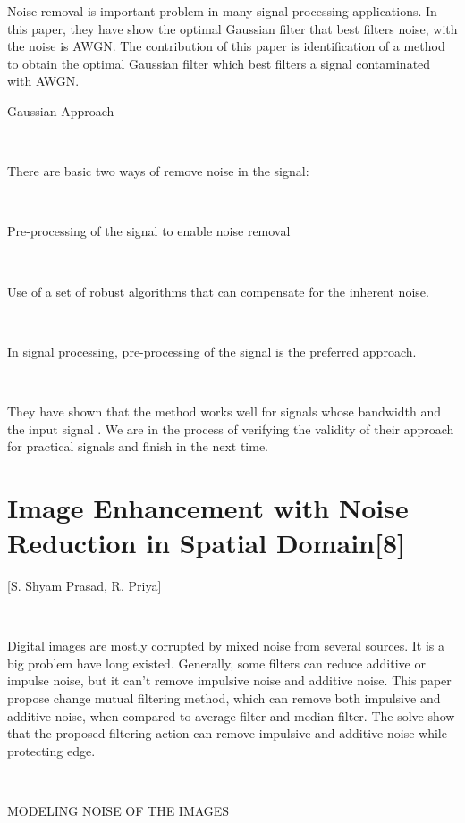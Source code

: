 Noise removal is important problem in many signal processing applications. In this paper, they have show the optimal Gaussian filter that best filters noise, with the noise is AWGN. The contribution of this paper is identification of a method to obtain the optimal Gaussian filter which best filters a signal contaminated with AWGN. 

Gaussian Approach

\

There are basic two ways of remove noise in the signal: 

\

Pre-processing of the signal to enable noise removal  

\

Use of a set of robust algorithms that can compensate for the inherent noise. 

\

In signal processing, pre-processing of the signal is the preferred approach.

\

They have shown that the method works well for signals whose bandwidth and the input signal . We are in the process of verifying the validity of their approach for practical signals and finish in the next time.

\section{Image Enhancement with Noise Reduction in Spatial Domain[8]}
[S. Shyam Prasad, R. Priya] 

\



Digital images are mostly corrupted by mixed noise from several sources. It is a big problem have long existed. Generally, some filters can reduce additive or impulse noise, but it can't remove impulsive noise and additive noise. This paper propose change mutual filtering method, which can remove both impulsive and additive noise, when compared to average filter and median filter.  The solve show that the proposed  filtering action can remove impulsive and additive noise while protecting edge.

\

MODELING NOISE OF THE IMAGES

\

